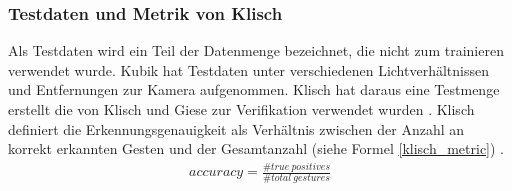 \subsubsection{Testdaten und Metrik von Klisch}
\label{sec:testdaten}
Als Testdaten wird ein Teil der Datenmenge bezeichnet, die nicht zum trainieren verwendet wurde. Kubik hat Testdaten unter verschiedenen Lichtverhältnissen und Entfernungen zur Kamera aufgenommen. Klisch hat
daraus eine Testmenge erstellt die von Klisch und Giese zur Verifikation verwendet wurden \cite{klischThesis, gieseThesis}. Klisch definiert die Erkennungsgenauigkeit als Verhältnis zwischen der Anzahl an korrekt
erkannten Gesten und der Gesamtanzahl (siehe Formel \ref{klisch_metric}) \cite{klischThesis}.
\begin{align}
    accuracy = \frac{\#true\ positives}{\#total\ gestures}
    \label{klisch_metric}
\end{align}
